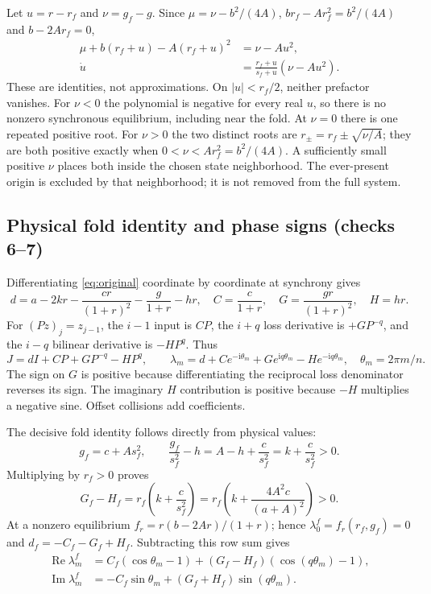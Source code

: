 \documentclass[11pt]{article}
\newcommand{\ii}{\mathrm i}
\newcommand{\Ree}{\operatorname{Re}}
\newcommand{\Imm}{\operatorname{Im}}
\begin{document}
Let $u=r-r_f$ and $\nu=g_f-g$. Since
$\mu=\nu-b^2/(4A)$, $br_f-Ar_f^2=b^2/(4A)$ and $b-2Ar_f=0$,
\begin{align}
 \mu+b(r_f+u)-A(r_f+u)^2&=\nu-Au^2,\\
 \dot u&=\frac{r_f+u}{s_f+u}(\nu-Au^2).
 \label{eq:exact}
\end{align}
These are identities, not approximations. On $|u|<r_f/2$, neither prefactor
vanishes. For $\nu<0$ the polynomial is negative for every real $u$, so there
is no nonzero synchronous equilibrium, including near the fold. At $\nu=0$
there is one repeated positive root. For $\nu>0$ the two distinct roots are
$r_\pm=r_f\pm\sqrt{\nu/A}$; they are both positive exactly when
$0<\nu<A r_f^2=b^2/(4A)$. A sufficiently small positive $\nu$ places both
inside the chosen state neighborhood. The ever-present origin is excluded
by that neighborhood; it is not removed from the full system.

\subsection{Physical fold identity and phase signs (checks 6--7)}
Differentiating \eqref{eq:original} coordinate by coordinate at synchrony gives
\[
 d=a-2kr-\frac{cr}{(1+r)^2}-\frac g{1+r}-hr,\quad
 C=\frac c{1+r},\quad G=\frac{gr}{(1+r)^2},\quad H=hr.
\]
For $(Pz)_j=z_{j-1}$, the $i-1$ input is $CP$, the $i+q$ loss derivative is
$+GP^{-q}$, and the $i-q$ bilinear derivative is $-HP^q$. Thus
\[
 J=dI+CP+GP^{-q}-HP^q,
 \qquad \lambda_m=d+Ce^{-\ii\theta_m}
                 +Ge^{\ii q\theta_m}-He^{-\ii q\theta_m},
 \quad\theta_m=2\pi m/n.
\]
The sign on $G$ is positive because differentiating the reciprocal loss
denominator reverses its sign. The imaginary $H$ contribution is positive
because $-H$ multiplies a negative sine. Offset collisions add coefficients.

The decisive fold identity follows directly from physical values:
\[
 g_f=c+A s_f^2,\qquad
 \frac{g_f}{s_f^2}-h=A-h+\frac c{s_f^2}=k+\frac c{s_f^2}>0.
\]
Multiplying by $r_f>0$ proves
\[
 \boxed{G_f-H_f=r_f\left(k+\frac c{s_f^2}\right)
 =r_f\left(k+\frac{4A^2c}{(a+A)^2}\right)>0.}
\]
At a nonzero equilibrium $f_r=r(b-2Ar)/(1+r)$; hence
$\lambda_0^f=f_r(r_f,g_f)=0$ and $d_f=-C_f-G_f+H_f$. Subtracting this row
sum gives
\begin{align*}
 \Ree\lambda_m^f&=C_f(\cos\theta_m-1)
             +(G_f-H_f)(\cos(q\theta_m)-1),\\
 \Imm\lambda_m^f&=-C_f\sin\theta_m+(G_f+H_f)\sin(q\theta_m).
\end{align*}
\end{document}
